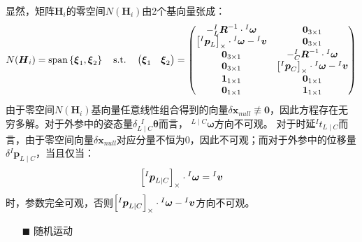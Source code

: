 显然，矩阵$\boldsymbol{H}_i$的零空间$N(\boldsymbol{H}_i)$由2个基向量张成：
\begin{equation}
  N(\boldsymbol{H}_i)=\mathrm{span}\left\lbrace
  \boldsymbol{\xi}_1,\boldsymbol{\xi}_2
  \right\rbrace
  \quad\mathrm{s.t.}\quad
  \begin{pmatrix}
    \boldsymbol{\xi}_1 & \boldsymbol{\xi}_2
  \end{pmatrix}=
  \begin{pmatrix}
    -{{^{I}_{L}}\boldsymbol{R}^{-1}}\cdot{^{I}\boldsymbol{\omega}}                     & \boldsymbol{0}_{3\times 1}                                                         \\
    \left[ {^{I}\boldsymbol{p}_L} \right]_\times\cdot{^{I}\boldsymbol{\omega}}-{^{I}\boldsymbol{v}} & \boldsymbol{0}_{3\times 1}                                                         \\
    \boldsymbol{0}_{3\times 1}                                                         & -{{^{I}_{C}}\boldsymbol{R}^{-1}}\cdot{^{I}\boldsymbol{\omega}}                     \\
    \boldsymbol{0}_{3\times 1}                                                         & \left[ {^{I}\boldsymbol{p}_C} \right]_\times\cdot{^{I}\boldsymbol{\omega}}-{^{I}\boldsymbol{v}} \\
    \boldsymbol{1}_{1\times 1}                                                         & \boldsymbol{0}_{1\times 1}                                                         \\
    \boldsymbol{0}_{1\times 1}                                                         & \boldsymbol{1}_{1\times 1}
  \end{pmatrix}
\end{equation}
由于零空间$N(\boldsymbol{H}_i)$基向量任意线性组合得到的向量$\delta\boldsymbol{x}_{null}\not\equiv\boldsymbol{0}$，因此方程存在无穷多解。对于外参中的姿态量$\delta {^{\;\;I}_{L\mid C}\boldsymbol{\theta}}$而言，
${^{L\mid C}\boldsymbol{\omega}}$方向不可观。
对于时延${^{I}t_{L\mid C}}$而言，由于零空间向量$\delta\boldsymbol{x}_{null}$对应分量不恒为0，因此不可观；而对于外参中的位移量$\delta {^{I}\boldsymbol{p}_{L\mid C}}$，当且仅当：
\begin{equation}
  \left[ {^{I}\boldsymbol{p}_{L\mid C}} \right]_\times\cdot{^{I}\boldsymbol{\omega}}={^{I}\boldsymbol{v}}
\end{equation}
时，参数完全可观，否则$\left[ {^{I}\boldsymbol{p}_{L\mid C}} \right]_\times\cdot{^{I}\boldsymbol{\omega}}-{^{I}\boldsymbol{v}}$方向不可观。

\begin{itemize}
  \item[$\blacksquare$]随机运动
\end{itemize}

